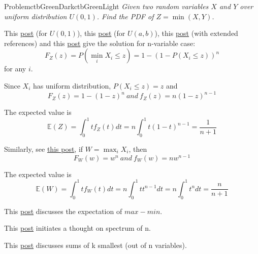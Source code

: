 \documentclass[11pt]{simple_doc}
\begin{document}

    \begin{cbstripe}{Problem}{ctbGreenDark}{ctbGreenLight}
        \textit{Given two random variables $X$ and $Y$ over uniform distribution $U(0, 1)$. Find
        the PDF of $Z = \min(X, Y)$.}
    \end{cbstripe}

    This \href{https://danieltakeshi.github.io/2016/09/25/the-expectation-of-the-minimum-of-iid-uniform-random-variables/}{post}
    (for $U(0, 1)$),
    this \href{https://math.stackexchange.com/questions/786392/expectation-of-minimum-of-n-i-i-d-uniform-random-variables}{post}
    (for $U(a, b)$),
    this \href{https://stats.stackexchange.com/questions/220/how-is-the-minimum-of-a-set-of-iid-random-variables-distributed}{post}
    (with extended references)
    and this \href{https://math.stackexchange.com/questions/308230/expectation-of-the-min-of-two-independent-random-variables}{post}
    give the solution for n-variable case:
    \begin{equation}
    F_Z(z) = P(\min_i X_i \leqslant z) = 1 - (1 - P(X_i \leqslant z))^n
    \end{equation}
    for any $i$.

    Since $X_i$ has uniform distribution, $P(X_i \leqslant z) = z$ and
    \begin{equation}
        F_Z(z) = 1 - (1 - z)^n \ and \ f_Z(z) = n(1 - z)^{n-1}
    \end{equation}

    The expected value is
    \begin{equation}
    \mathbb{E}(Z) = \int_0^1 tf_Z(t)dt = n \int_0^1 t(1-t)^{n-1} = \frac{1}{n+1}
    \end{equation}

    Similarly, see \href{https://math.stackexchange.com/questions/197299/expected-value-of-maximum-of-two-random-variables-from-uniform-distribution}{this post},
    if $\displaystyle  W = \max_i X_i$, then
    \begin{equation}
        F_W(w) = w^n \ and \ f_W(w) = nw^{n-1}
    \end{equation}

    The expected value is
    \begin{equation}
    \mathbb{E}(W) = \int_0^1 tf_W(t)dt = n \int_0^1 tt^{n-1} dt = n \int_0^1 t^{n}dt = \frac{n}{n+1}
    \end{equation}

    This \href{https://math.stackexchange.com/questions/1242784/the-maximum-and-minimum-of-five-independent-uniform-random-variables}{post}
    discusses the expectation of $max - min$.

    This \href{https://www.quora.com/What-is-the-distribution-of-the-maximum-or-minimum-of-two-independent-random-variables-with-an-arbitrary-distribution}{post}
    initiates a thought on spectrum of n.

    This \href{https://math.stackexchange.com/questions/1668099/what-is-the-expected-value-of-the-sum-of-the-k-out-of-a-set-of-n-smallest}{post}
    discusses sums of k smallest (out of n variables).
\end{document}
